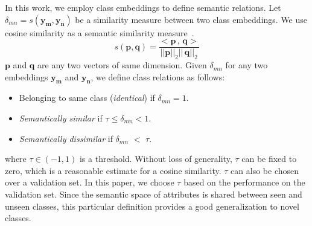 \documentclass[10pt,twocolumn,letterpaper]{article}
\begin{document}
In this work, we employ class embeddings to 
define semantic relations. Let $\delta_{mn}=s(\mathbf{y_m},\mathbf{y_n})$ be a similarity measure between two class embeddings. We use cosine similarity as a semantic similarity measure~\cite{mikolov2013distributed,mikolov2013efficient}.
\begin{equation}
s(\mathbf{p},\mathbf{q}) = \dfrac{<\mathbf{p}\, ,\, \mathbf{q}>}{||\mathbf{p}||_2||\, \mathbf{q}||_2}
\end{equation}
$\mathbf{p}$ and $\mathbf{q}$ are any two vectors of same dimension.
Given $\delta_{mn}$ for any two embeddings $\mathbf{y_m}$ and $\mathbf{y_n}$, we define class relations as follows:
\begin{itemize}
	\itemsep0em
	\item Belonging to same class (\textit{identical}) if $\delta_{mn}  =1$.
	\item \textit{Semantically similar} if $ \tau \leq \delta_{mn} < 1$.
	\item \textit{Semantically dissimilar} if $\delta_{mn}$ $<$ $\tau$.
\end{itemize}
where $\tau\in (-1,1)$ is a threshold. Without loss of generality, $\tau$ can be fixed to zero, which is a reasonable estimate for a cosine similarity. $\tau$ can also be chosen over a validation set. 
In this paper, we choose $\tau$ based on the performance on the validation set.
Since the semantic space of attributes is shared between seen and unseen classes, this particular definition provides a good generalization to novel classes.
\end{document}

